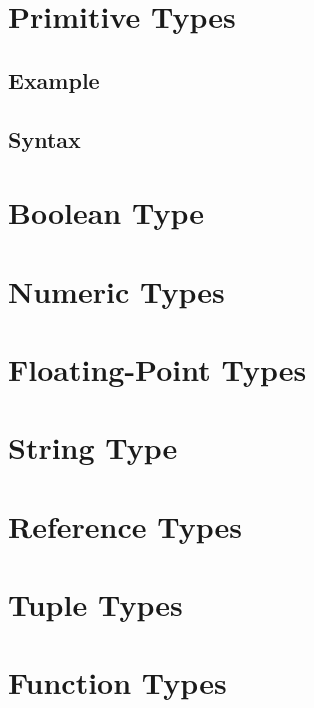 \documentclass[a4paper,oneside,12pt, extrafontsizes]{memoir}
\begin{document}
  \chapter{Primitive Types}
  \label{ch:primitive-types}
  

    \section{Example}
    

    \section{Syntax}
    

  \chapter{Boolean Type}
  \label{ch:boolean}
  

  \chapter{Numeric Types}
  \label{ch:numeric-types}
  

  \chapter{Floating-Point Types}
  \label{ch:floating-point}
  

  \chapter{String Type}
  \label{ch:string}
  

  \chapter{Reference Types}
  \label{ch:concept-types}
  

  \chapter{Tuple Types}
  \label{ch:tuple-types}
  

  \chapter{Function Types}
  \label{ch:function-types}
  
\end{document}
